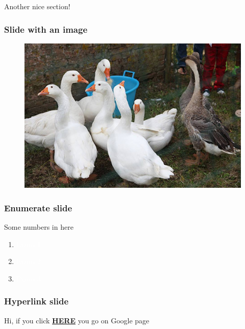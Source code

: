 \documentclass[xcolor=dvipsnames,aspectratio=169]{beamer}
\begin{document}
{\begin{section}{Another nice section!}
\begin{frame}[t]
\frametitle{Slide with an image} 
\begin{figure}
  \centering
  \includegraphics[scale=0.22]{Immagini/duck.jpg}
\end{figure}
\end{frame}

\begin{frame}[t]
\frametitle{Enumerate slide} 
Some numbers in here
\begin{enumerate}
\item \textcolor{white}{Enum 1}
\item  \textcolor{white}{Enum 2}
\item  \textcolor{white}{Enum 3}
\end{enumerate} 
\end{frame}
\end{section}

\begin{frame}[t]
\frametitle{Hyperlink slide} 
Hi, if you click \textbf{\href{https://www.google.com}{HERE}} you go on Google page 
\end{frame}

}
\end{document}
